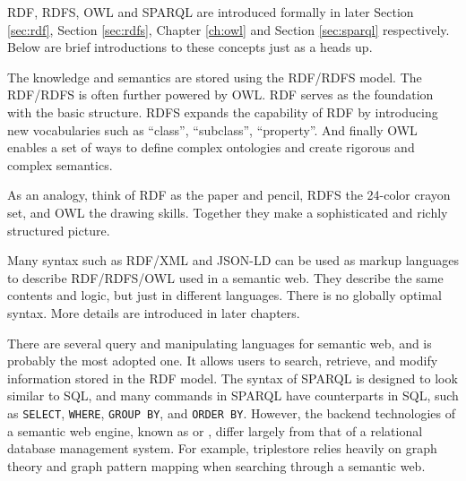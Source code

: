 RDF, RDFS, OWL and SPARQL are introduced formally in later Section \ref{sec:rdf}, Section \ref{sec:rdfs}, Chapter \ref{ch:owl} and Section \ref{sec:sparql} respectively. Below are brief introductions to these concepts just as a heads up.

The knowledge and semantics are stored using the RDF/RDFS model. The RDF/RDFS is often further powered by OWL. RDF serves as the foundation with the basic structure. RDFS expands the capability of RDF by introducing new vocabularies such as ``class'', ``subclass'', ``property''. And finally OWL enables a set of ways to define complex ontologies and create rigorous and complex semantics. 

As an analogy, think of RDF as the paper and pencil, RDFS the 24-color crayon set, and OWL the drawing skills. Together they make a sophisticated and richly structured picture.

Many syntax such as RDF/XML and JSON-LD can be used as markup languages to describe RDF/RDFS/OWL used in a semantic web. They describe the same contents and logic, but just in different languages. There is no globally optimal syntax. More details are introduced in later chapters.

There are several query and manipulating languages for semantic web, and  is probably the most adopted one. It allows users to search, retrieve, and modify information stored in the RDF model. The syntax of SPARQL is designed to look similar to SQL, and many commands in SPARQL have counterparts in SQL, such as \verb|SELECT|, \verb|WHERE|, \verb|GROUP BY|, and \verb|ORDER BY|. However, the backend technologies of a semantic web engine, known as  or , differ largely from that of a relational database management system. For example, triplestore relies heavily on graph theory and graph pattern mapping when searching through a semantic web.

